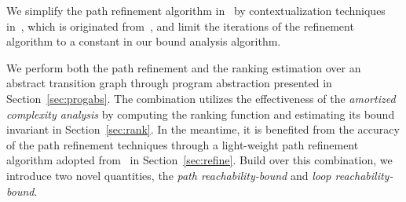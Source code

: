 \begin{itemize}
We simplify the path refinement algorithm in~\cite{GulwaniJK09} by contextualization techniques in~\cite{ZulegerGSV11,SinnZV14}, which is originated from~\cite{ManoliosV06},
and limit the iterations of the refinement algorithm to a constant in our bound analysis algorithm.
\end{itemize}
We perform both the path refinement and the ranking estimation over an abstract transition graph through program abstraction presented in Section~\ref{sec:progabs}.
The combination utilizes the effectiveness of the \emph{amortized complexity analysis} by computing the ranking function
and estimating its bound invariant in Section~\ref{sec:rank}.
In the meantime, it is benefited from the accuracy of the path refinement techniques through a light-weight path refinement algorithm adopted from~\cite{GulwaniJK09} in Section~\ref{sec:refine}.
Build over this combination, we introduce two novel quantities,
the \emph{path reachability-bound} and \emph{loop reachability-bound}.

